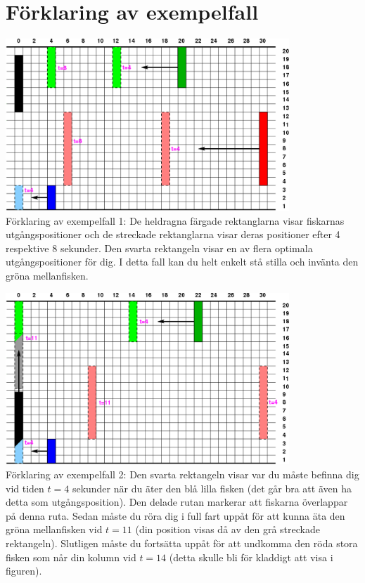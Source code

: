 \section*{Förklaring av exempelfall}
\includegraphics[width=0.8\textwidth]{fiskspelet.png}\\
Förklaring av exempelfall 1: De heldragna färgade rektanglarna
visar fiskarnas utgångspositioner och de streckade rektanglarna visar
deras positioner efter 4 respektive 8 sekunder. Den svarta rektangeln
visar en av flera optimala utgångspositioner för dig. I detta fall kan
du helt enkelt stå stilla och invänta den gröna mellanfisken.

\includegraphics[width=0.8\textwidth]{fiskspelet2.png}\\
Förklaring av exempelfall 2: Den svarta rektangeln visar var
du måste befinna dig vid tiden $t=4$ sekunder när du äter den blå
lilla fisken (det går bra att även ha detta som utgångsposition). Den
delade rutan markerar att fiskarna överlappar på denna ruta. Sedan
måste du röra dig i full fart uppåt för att kunna äta den gröna
mellanfisken vid $t=11$ (din position visas då av den grå streckade
rektangeln). Slutligen måste du fortsätta uppåt för att undkomma den
röda stora fisken som når din kolumn vid $t=14$ (detta skulle bli för
kladdigt att visa i figuren).